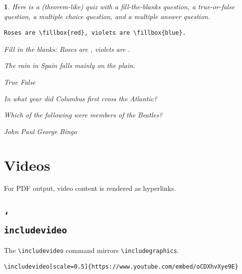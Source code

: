 \documentclass{article}
\theoremstyle{break}
\newtheorem{quiz}[theorem]{\quizname}
\newcommand{\vbs}{\char`\\}
\begin{document}
\bigskip
\begin{quiz}
Here is a (theorem-like) quiz with a fill-the-blanks question, a true-or-false question, a multiple choice question, and a multiple answer question.

\begin{Verbatim}[frame=single]
Roses are \fillbox{red}, violets are \fillbox{blue}.
\end{Verbatim}

\begin{questions}
\question
Fill in the blanks: {\sl
	Roses are , violets are .
}


\question\label{qu:rain}
The rain in Spain falls mainly on the plain.
\begin{choices}
\correctchoice True 		
\choice False		
\end{choices}

\question\label{qu:america}
In what year did Columbus first cross the Atlantic?
\begin{choices}
\end{choices}

\question\label{qu:beatles}
Which of the following were members of the Beatles?
\begin{checkboxes}
\correctchoice John
\correctchoice Paul
\correctchoice George
\choice Bingo
\end{checkboxes}

\end{questions}
\end{quiz}

\section{Videos}
For PDF output, video content is rendered as hyperlinks.

\subsection{\tt\vbs includevideo}
The \verb+\includevideo+ command mirrors \verb+\includegraphics+. 

\begin{Verbatim}[frame=single]
\includevideo[scale=0.5]{https://www.youtube.com/embed/oCDXhvXye9E}
\end{Verbatim}
\end{document}
